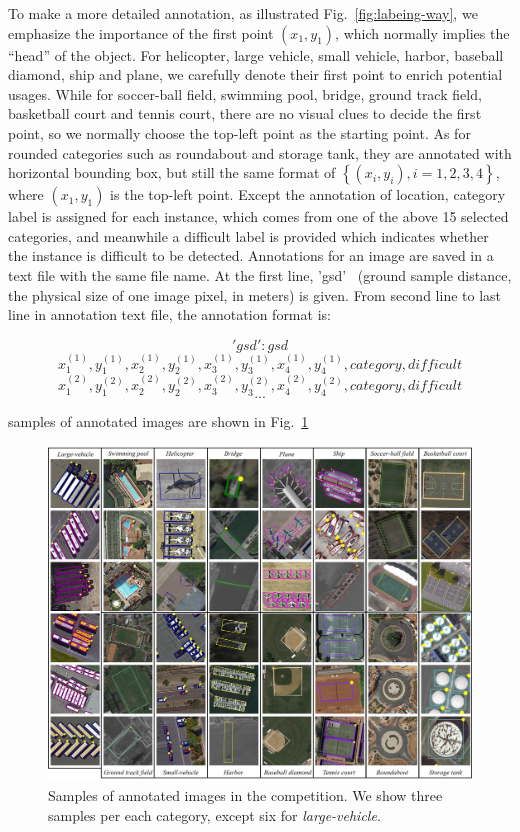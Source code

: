 \documentclass[a4paper]{article}
\begin{document}
To make a more detailed annotation, as illustrated Fig.~\ref{fig:labeing-way}, we emphasize the importance of the first point \((x_1,y_1)\), which normally implies the “head” of the object. For helicopter,
large vehicle, small vehicle, harbor, baseball diamond, ship and plane, we carefully denote their first point to enrich potential usages. While for soccer-ball field, swimming
pool, bridge, ground track field, basketball court and tennis court, there are no visual clues to decide the first point, so we normally choose the top-left point as the starting
point. As for rounded categories such as roundabout and storage tank, they are annotated with horizontal bounding box, but still the same format of \(\left \{ (x_i,y_i), i=1,2,3,4 \right \}\), where $(x_1, y_1)$ is the top-left point.
Except the annotation of location, category label is assigned for each instance, which comes from one of the above 15 selected categories, and meanwhile a difficult label is provided which indicates whether the instance is difficult to be detected. 
Annotations for an image are saved in a text file with the same file name. At the first line, 'gsd'~\cite{gsd} (ground sample distance, the physical size of one image pixel, in meters) is given.  
From second line to last line in annotation text file, the annotation format is:

$$'gsd': gsd$$
$$x_1^{(1)}, y_1^{(1)}, x_2^{(1)}, y_2^{(1)}, x_3^{(1)}, y_3^{(1)}, x_4^{(1)}, y_4^{(1)}, category, difficult$$
$$x_1^{(2)}, y_1^{(2)}, x_2^{(2)}, y_2^{(2)}, x_3^{(2)}, y_3^{(2)}, x_4^{(2)}, y_4^{(2)}, category, difficult$$
$$...$$

samples of annotated images are shown in Fig.~\ref{fig:samples}

\begin{figure}[htb!]
\begin{center}
    \includegraphics[width=0.95\linewidth]{instances-DOTA.jpg}
\end{center}
\vspace{-3mm}
\caption{Samples of annotated images in the competition. We show three samples per each category, except six for {\em large-vehicle}. }
\label{fig:samples}
\vspace{-2mm}
\end{figure}
\end{document}
